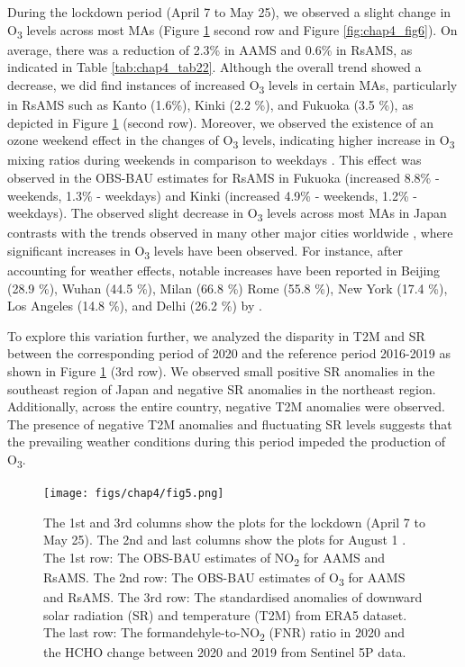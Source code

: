 During the lockdown period (April 7 to May 25), we observed a slight change in O\textsubscript{3} levels across most MAs (Figure \ref{fig:chap4_fig5} second row and Figure \ref{fig:chap4_fig6}). On average, there was a reduction of 2.3\% in AAMS and 0.6\% in RsAMS, as indicated in Table \ref{tab:chap4_tab22}. Although the overall trend showed a decrease, we did find instances of increased O\textsubscript{3} levels in certain MAs, particularly in RsAMS such as Kanto (1.6\%), Kinki (2.2 \%), and Fukuoka (3.5 \%), as depicted in Figure \ref{fig:chap4_fig5} (second row). Moreover, we observed the existence of an ozone weekend effect in the changes of O\textsubscript{3} levels, indicating higher increase in O\textsubscript{3} mixing ratios during weekends in comparison to weekdays \citep{akimoto2022rethinking}. This effect was observed in the OBS-BAU estimates for RsAMS in Fukuoka (increased 8.8\% - weekends, 1.3\% - weekdays) and Kinki (increased 4.9\% - weekends, 1.2\% - weekdays).
The observed slight decrease in O\textsubscript{3} levels across most MAs in Japan contrasts with the trends observed in many other major cities worldwide \citep{shi2021abrupt,grange2021covid}, where significant increases in O\textsubscript{3} levels have been observed. For instance, after accounting for weather effects, notable increases have been reported in Beijing (28.9 \%), Wuhan (44.5 \%), Milan (66.8 \%) Rome (55.8 \%), New York (17.4 \%), Los Angeles (14.8 \%), and Delhi (26.2 \%) by \citep{shi2021abrupt}.\par
To explore this variation further, we analyzed the disparity in T2M and SR between the corresponding period of 2020 and the reference period 2016-2019 as shown in Figure \ref{fig:chap4_fig5} (3rd row). We observed small positive SR anomalies in the southeast region of Japan and negative SR anomalies in the northeast region. Additionally, across the entire country, negative T2M anomalies were observed. The presence of negative T2M anomalies and fluctuating SR levels suggests that the prevailing weather conditions during this period impeded the production of O\textsubscript{3}. \par

\begin{figure}[p]
    \centering
    \texttt{[image: figs/chap4/fig5.png]}
    \caption[NO\textsubscript{2}, O\textsubscript{3}, SR, T2M, FNR, and HCHO variations in 2020]{The 1st and 3rd columns show the plots for the lockdown (April 7 to May 25). The 2nd and last columns show the plots for August 1 . The 1st row: The OBS-BAU estimates of NO\textsubscript{2} for AAMS and RsAMS. The 2nd row: The OBS-BAU estimates of O\textsubscript{3} for AAMS and RsAMS. The 3rd row: The standardised anomalies of downward solar radiation (SR) and temperature (T2M) from ERA5 dataset. The last row: The formandehyle-to-NO\textsubscript{2} (FNR) ratio in 2020 and the HCHO change between 2020 and 2019 from Sentinel 5P data.}
    \label{fig:chap4_fig5}
\end{figure}

